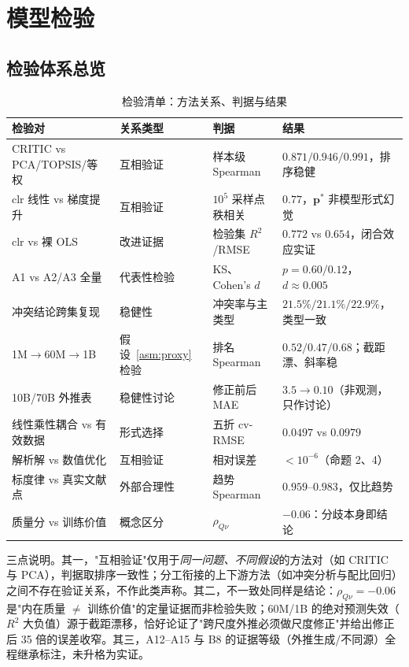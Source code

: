 \section{模型检验}

\subsection{检验体系总览}

\begin{table}[H]
\centering\small
\caption{检验清单：方法关系、判据与结果}
\begin{tabular}{p{3.6cm}p{2.1cm}p{3.4cm}p{4.6cm}}
\toprule
检验对 & 关系类型 & 判据 & 结果 \\
\midrule
CRITIC vs PCA/TOPSIS/等权 & 互相验证 & 样本级 Spearman & $0.871/0.946/0.991$，排序稳健 \\
clr 线性 vs 梯度提升 & 互相验证 & $10^5$ 采样点秩相关 & $0.77$，$\bm p^*$ 非模型形式幻觉 \\
clr vs 裸 OLS & 改进证据 & 检验集 $R^2$/RMSE & $0.772$ vs $0.654$，闭合效应实证 \\
A1 vs A2/A3 全量 & 代表性检验 & KS、Cohen's $d$ & $p=0.60/0.12$，$d\approx0.005$ \\
冲突结论跨集复现 & 稳健性 & 冲突率与主类型 & $21.5\%/21.1\%/22.9\%$，类型一致 \\
1M$\to$60M$\to$1B & 假设~\ref{asm:proxy} 检验 & 排名 Spearman & $0.52/0.47/0.68$；截距漂、斜率稳 \\
10B/70B 外推表 & 稳健性讨论 & 修正前后 MAE & $3.5\to0.10$（非观测，只作讨论） \\
线性乘性耦合 vs 有效数据 & 形式选择 & 五折 cv-RMSE & $0.0497$ vs $0.0979$ \\
解析解 vs 数值优化 & 互相验证 & 相对误差 & $<10^{-6}$（命题 2、4） \\
标度律 vs 真实文献点 & 外部合理性 & 趋势 Spearman & $0.959$--$0.983$，仅比趋势 \\
质量分 vs 训练价值 & 概念区分 & $\rho_{Q\nu}$ & $-0.06$：分歧本身即结论 \\
\bottomrule
\end{tabular}
\label{tab:checks}
\end{table}

三点说明。其一，"互相验证"仅用于\emph{同一问题、不同假设}的方法对（如 CRITIC 与 PCA），判据取排序一致性；分工衔接的上下游方法（如冲突分析与配比回归）之间不存在验证关系，不作此类声称。其二，不一致处同样是结论：$\rho_{Q\nu}=-0.06$ 是"内在质量 $\ne$ 训练价值"的定量证据而非检验失败；60M/1B 的绝对预测失效（$R^2$ 大负值）源于截距漂移，恰好论证了"跨尺度外推必须做尺度修正"并给出修正后 35 倍的误差收窄。其三，A12--A15 与 B8 的证据等级（外推生成/不同源）全程继承标注，未升格为实证。

